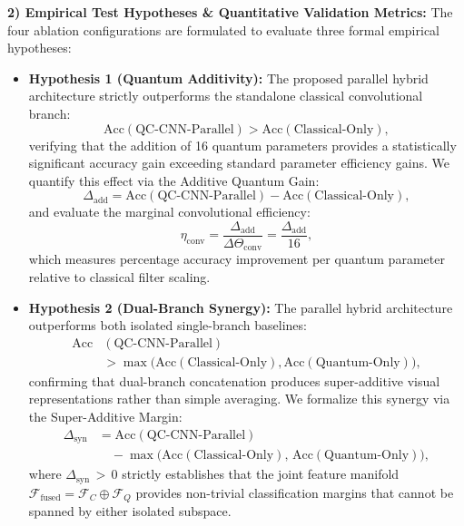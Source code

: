 \documentclass[journal]{IEEEtran}
\begin{document}
\textbf{2) Empirical Test Hypotheses \& Quantitative Validation Metrics:}
The four ablation configurations are formulated to evaluate three formal empirical hypotheses:
\begin{itemize}
    \item \textbf{Hypothesis 1 (Quantum Additivity):} The proposed parallel hybrid architecture strictly outperforms the standalone classical convolutional branch:
    \begin{equation}
    \mathrm{Acc}(\text{QC-CNN-Parallel}) > \mathrm{Acc}(\text{Classical-Only}),
    \label{eq:hyp_additivity}
    \end{equation}
    verifying that the addition of 16 quantum parameters provides a statistically significant accuracy gain exceeding standard parameter efficiency gains. We quantify this effect via the Additive Quantum Gain:
    \begin{equation}
    \Delta_{\mathrm{add}} = \mathrm{Acc}(\text{QC-CNN-Parallel}) - \mathrm{Acc}(\text{Classical-Only}),
    \label{eq:additive_gain_def}
    \end{equation}
    and evaluate the marginal convolutional efficiency:
    \begin{equation}
    \eta_{\mathrm{conv}} = \frac{\Delta_{\mathrm{add}}}{\Delta \Theta_{\mathrm{conv}}} = \frac{\Delta_{\mathrm{add}}}{16},
    \label{eq:param_efficiency_ratio}
    \end{equation}
    which measures percentage accuracy improvement per quantum parameter relative to classical filter scaling.

    \item \textbf{Hypothesis 2 (Dual-Branch Synergy):} The parallel hybrid architecture outperforms both isolated single-branch baselines:
    \begin{align}
    \mathrm{Acc}&(\text{QC-CNN-Parallel}) \nonumber \\
    &> \max\big(\mathrm{Acc}(\text{Classical-Only}), \mathrm{Acc}(\text{Quantum-Only})\big),
    \label{eq:hyp_synergy}
    \end{align}
    confirming that dual-branch concatenation produces super-additive visual representations rather than simple averaging. We formalize this synergy via the Super-Additive Margin:
    \begin{align}
    \Delta_{\mathrm{syn}} &= \mathrm{Acc}(\text{QC-CNN-Parallel}) \nonumber \\
    &\quad - \max\Big(\mathrm{Acc}(\text{Classical-Only}), \, \mathrm{Acc}(\text{Quantum-Only})\Big),
    \label{eq:synergy_margin_def}
    \end{align}
    where $\Delta_{\mathrm{syn}} \,{>}\, 0$ strictly establishes that the joint feature manifold $\mathcal{F}_{\mathrm{fused}} = \mathcal{F}_C \oplus \mathcal{F}_Q$ provides non-trivial classification margins that cannot be spanned by either isolated subspace.


\end{itemize}
\end{document}
